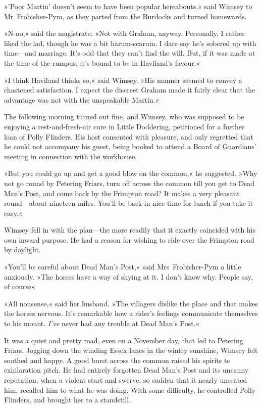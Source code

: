 »'Poor Martin' doesn't seem to have been popular hereabouts,« said Wimsey to Mr~Frobisher-Pym, as they parted from the Burdocks and turned homewards.

»N-no,« said the magistrate. »Not with Graham, anyway. Personally, I rather liked the lad, though he was a bit harum-scarum. I dare say he's sobered up with time—and marriage. It's odd that they can't find the will. But, if it was made at the time of the rumpus, it's bound to be in Haviland's favour.«

»I think Haviland thinks so,« said Wimsey. »His manner seemed to convey a chastened satisfaction. I expect the discreet Graham made it fairly clear that the advantage was not with the unspeakable Martin.«

The following morning turned out fine, and Wimsey, who was supposed to be enjoying a rest-and-fresh-air cure in Little Doddering, petitioned for a further loan of Polly Flinders. His host consented with pleasure, and only regretted that he could not accompany his guest, being booked to attend a Board of Guardians' meeting in connection with the workhouse.

»But you could go up and get a good blow on the common,« he suggested. »Why not go round by Petering Friars, turn off across the common till you get to Dead Man's Post, and come back by the Frimpton road? It makes a very pleasant round—about nineteen miles. You'll be back in nice time for lunch if you take it easy.«

Wimsey fell in with the plan—the more readily that it exactly coincided with his own inward purpose. He had a reason for wishing to ride over the Frimpton road by daylight.

»You'll be careful about Dead Man's Post,« said Mrs~Frobisher-Pym a little anxiously. »The horses have a way of shying at it. I don't know why. People say, of course\longdash«

»All nonsense,« said her husband. »The villagers dislike the place and that makes the horses nervous. It's remarkable how a rider's feelings communicate themselves to his mount. \textit{I've} never had any trouble at Dead Man's Post.«

It was a quiet and pretty road, even on a November day, that led to Petering Friars. Jogging down the winding Essex lanes in the wintry sunshine, Wimsey felt soothed and happy. A good burst across the common raised his spirits to exhilaration pitch. He had entirely forgotten Dead Man's Post and its uncanny reputation, when a violent start and swerve, so sudden that it nearly unseated him, recalled him to what he was doing. With some difficulty, he controlled Polly Flinders, and brought her to a standstill.

